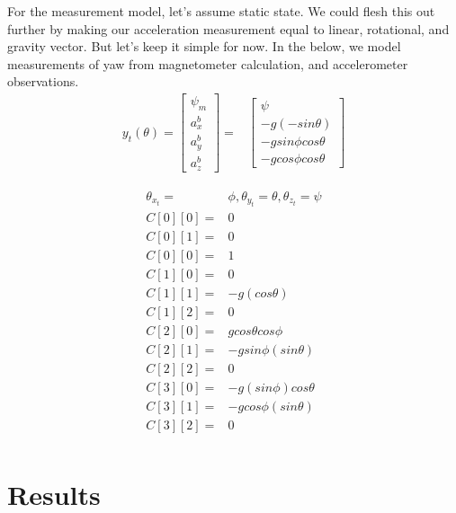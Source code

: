 \documentclass[conference]{IEEEtran}
\begin{document}
For the measurement model, let's assume static state. We could flesh this out further by making our acceleration measurement equal to linear, rotational, and gravity vector. But let's keep it simple for now. In the below, we model measurements of yaw from magnetometer calculation, and accelerometer observations.
\begin{align}
y_t(\theta) = \begin{bmatrix} \psi_m \\ a_x^b \\  a_y^b \\  a_z^b \end{bmatrix} =& \begin{bmatrix} \psi\\
															 -g (-sin \theta)\\
													              -g sin \phi cos \theta \\
													               -g cos \phi cos \theta \end{bmatrix} \nonumber
\end{align}

\begin{align*}
\theta_{x_{t}}=&\phi, \theta_{y_{t}}=\theta, \theta_{z_{t}}=\psi \\
C[0][0] = & 0 \\
C[0][1] = & 0 \\
C[0][0] =& 1\\
C[1][0] = & 0 \\
C[1][1] = & -g (cos\theta) \\
C[1][2] = & 0 \\
C[2][0] = & g cos\theta cos\phi \\
C[2][1] = & -g sin\phi(sin\theta)\\
C[2][2] = & 0\\
C[3][0] = & -g (sin\phi) cos\theta\\
C[3][1] = & -g cos\phi (sin\theta)\\
C[3][2] = & 0\\
\end{align*}

\section{Results}
\end{document}
